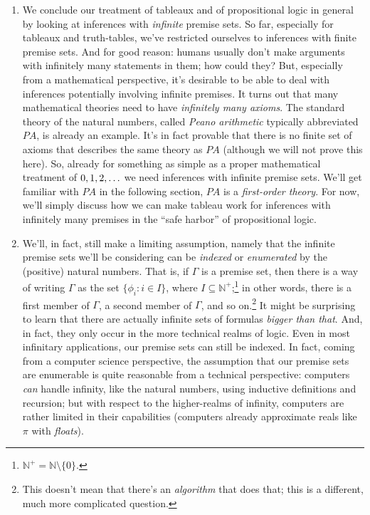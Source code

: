 	\begin{enumerate}[\thesection.1]

	  \item We conclude our treatment of tableaux and of propositional logic in general by looking at inferences with \emph{infinite} premise sets.
		So far, especially for tableaux and truth-tables, we've restricted ourselves to inferences with finite premise sets.
		And for good reason: humans usually don't make arguments with infinitely many statements in them; how could they?
		But, especially from a mathematical perspective, it's desirable to be able to deal with inferences potentially involving infinite premises.
		It turns out that many mathematical theories need to have \emph{infinitely many axioms}.
		The standard theory of the natural numbers, called \emph{Peano arithmetic} typically abbreviated $PA$, is already an example.
		It's in fact provable that there is no finite set of axioms that describes the same theory as $PA$ (although we will not prove this here).
		So, already for something as simple as a proper mathematical treatment of $0,1,2,\mathellipsis$ we need inferences with infinite premise sets.
		We'll get familiar with $PA$ in the following section, $PA$ is a \emph{first-order theory}.
		For now, we'll simply discuss how we can make tableau work for inferences with infinitely many premises in the ``safe harbor'' of propositional logic.
		
		\item We'll, in fact, still make a limiting assumption, namely that the infinite premise sets we'll be considering can be \emph{indexed} or \emph{enumerated} by the (positive) natural numbers. That is, if $\Gamma$ is a premise set, then there is a way of writing $\Gamma$ as the set $\{\phi_i:i\in I\}$, where $I\subseteq\mathbb{N}^+$;\footnote{$\mathbb{N}^+=\mathbb{N}\setminus\{0\}$.} in other words, there is a first member of $\Gamma$, a second member of $\Gamma$, and so on.\footnote{This doesn't mean that there's an \emph{algorithm} that does that; this is a different, much more complicated question.}  It might be surprising to learn that there are actually infinite sets of formulas \emph{bigger than that}. And, in fact, they only occur in the more technical realms of logic. Even in most infinitary applications, our premise sets can still be indexed. In fact, coming from a computer science perspective, the assumption that our premise sets are enumerable is quite reasonable from a technical perspective: computers \emph{can} handle infinity, like the natural numbers, using inductive definitions and recursion; but with respect to the higher-realms of infinity, computers are rather limited in their capabilities (computers already approximate reals like $\pi$ with \emph{floats}).
		

\end{enumerate}
